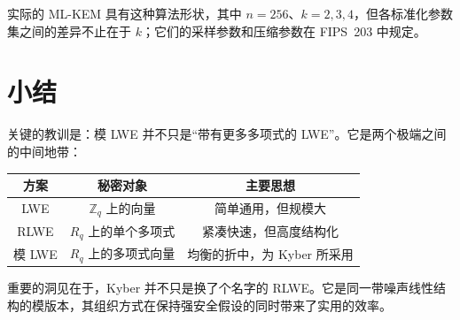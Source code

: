 实际的 ML-KEM 具有这种算法形状，其中 $n=256$、$k=2,3,4$，但各标准化参数集之间的差异不止在于 $k$；它们的采样参数和压缩参数在 FIPS~203 中规定。

\section{小结}

关键的教训是：模 LWE 并不只是“带有更多多项式的 LWE”。它是两个极端之间的中间地带：

\begin{table}[h]
\centering
\begin{tabular}{|c|c|c|}
\hline
方案 & 秘密对象 & 主要思想 \\
\hline
LWE & $\mathbb{Z}_q$ 上的向量 & 简单通用，但规模大 \\
\hline
RLWE & $R_q$ 上的单个多项式 & 紧凑快速，但高度结构化 \\
\hline
模 LWE & $R_q$ 上的多项式向量 & 均衡的折中，为 Kyber 所采用 \\
\hline
\end{tabular}
\end{table}

重要的洞见在于，Kyber 并不只是换了个名字的 RLWE。它是同一带噪声线性结构的模版本，其组织方式在保持强安全假设的同时带来了实用的效率。

\printbibliography[heading=chapterrefs]
